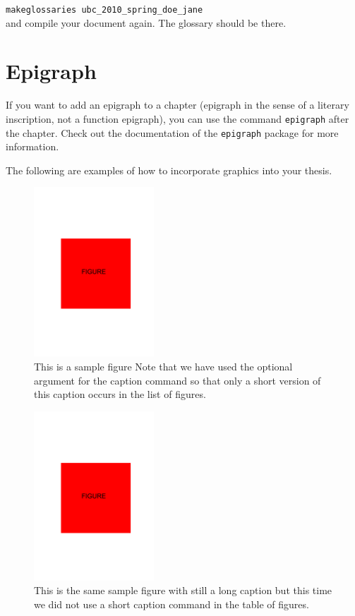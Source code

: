\documentclass[msc,oneside]{ubcthesis}%
\begin{document}
\texttt{makeglossaries ubc\_2010\_spring\_doe\_jane}\\
and compile your document again. The glossary should be there.

\section{Epigraph}
If you want to add an epigraph to a chapter (epigraph in the sense of a literary inscription, not a function epigraph), you can use the command \texttt{epigraph} after the chapter. Check out the documentation of the \texttt{epigraph} package for more information.

The following are examples of how to incorporate graphics into your thesis.

\begin{figure}[ht]
  \begin{center}
    \includegraphics[width=0.4\textwidth]{figure}
    \caption[Sample figure.]{\label{fig:happy} This is a sample figure
      Note that we have
      used the optional argument for the caption command so that only
      a short version of this caption occurs in the list of figures.}
  \end{center}
\end{figure}

\begin{figure}[ht]
  \begin{center}
    \includegraphics[width=0.4\textwidth]{figure}
    \caption{\label{fig:happy2} This is the same sample figure with still
			a long caption but this time we did not use a short caption command
			in the table of figures.}
  \end{center}
\end{figure}
\end{document}
